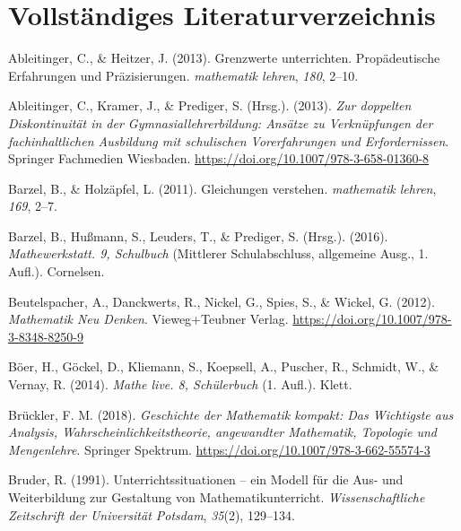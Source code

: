 \documentclass[
]{scrbook}
\newlength{\cslhangindent}
\newenvironment{CSLReferences}[2] %
 {\begin{list}{}{%
  \setlength{\itemindent}{0pt}
  \setlength{\leftmargin}{0pt}
  \setlength{\parsep}{0pt}
  \ifodd #1
   \setlength{\leftmargin}{\cslhangindent}
   \setlength{\itemindent}{-1\cslhangindent}
  \fi
  \setlength{\itemsep}{#2\baselineskip}}}
 {\end{list}}
\theoremstyle{definition}
\theoremstyle{definition}
\theoremstyle{definition}
\theoremstyle{definition}
\theoremstyle{remark}
\begin{document}
\chapter{Vollständiges Literaturverzeichnis}\label{vollstuxe4ndiges-literaturverzeichnis}

\label{refs}
\begin{CSLReferences}{1}{0}
Ableitinger, C., \& Heitzer, J. (2013). Grenzwerte unterrichten. {Propädeutische} {Erfahrungen} und {Präzisierungen}. \emph{mathematik lehren}, \emph{180}, 2--10.

Ableitinger, C., Kramer, J., \& Prediger, S. (Hrsg.). (2013). \emph{Zur doppelten {Diskontinuität} in der {Gymnasiallehrerbildung}: {Ansätze} zu {Verknüpfungen} der fachinhaltlichen {Ausbildung} mit schulischen {Vorerfahrungen} und {Erfordernissen}}. Springer Fachmedien Wiesbaden. \url{https://doi.org/10.1007/978-3-658-01360-8}

Barzel, B., \& Holzäpfel, L. (2011). Gleichungen verstehen. \emph{mathematik lehren}, \emph{169}, 2--7.

Barzel, B., Hußmann, S., Leuders, T., \& Prediger, S. (Hrsg.). (2016). \emph{Mathewerkstatt. 9, {Schulbuch}} (Mittlerer Schulabschluss, allgemeine Ausg., 1. Aufl.). Cornelsen.

Beutelspacher, A., Danckwerts, R., Nickel, G., Spies, S., \& Wickel, G. (2012). \emph{Mathematik {Neu} {Denken}}. Vieweg+Teubner Verlag. \url{https://doi.org/10.1007/978-3-8348-8250-9}

Böer, H., Göckel, D., Kliemann, S., Koepsell, A., Puscher, R., Schmidt, W., \& Vernay, R. (2014). \emph{Mathe live. 8, {Schülerbuch}} (1. Aufl.). Klett.

Brückler, F. M. (2018). \emph{Geschichte der {Mathematik} kompakt: {Das} {Wichtigste} aus {Analysis}, {Wahrscheinlichkeitstheorie}, angewandter {Mathematik}, {Topologie} und {Mengenlehre}}. Springer Spektrum. \url{https://doi.org/10.1007/978-3-662-55574-3}

Bruder, R. (1991). Unterrichtssituationen -- ein {Modell} für die {Aus}- und {Weiterbildung} zur {Gestaltung} von {Mathematikunterricht}. \emph{Wissenschaftliche Zeitschrift der Universität Potsdam}, \emph{35}(2), 129--134.


\end{CSLReferences}
\end{document}
